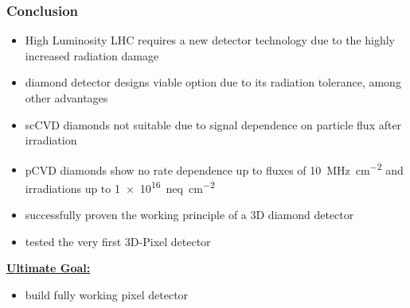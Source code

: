 \begin{frame}
	\frametitle{Conclusion}
	\begin{itemize}
		\setlength{\itemsep}{\fill}
		\item High Luminosity LHC requires a new detector technology due to the highly increased radiation damage 
		\item diamond detector designs viable option due to its radiation tolerance, among other advantages
		\item scCVD diamonds not suitable due to signal dependence on particle flux after irradiation
		\item pCVD diamonds show no rate dependence up to fluxes of \SI{10}{\mega\hertz\per cm^2} and irradiations up to \SI{1e16}{neq\per cm^2}
		\item successfully proven the working principle of a 3D diamond detector
		\item tested the very first 3D-Pixel detector
	\end{itemize}
	\vspace*{5pt}
	\textbf{\underline{Ultimate Goal:}}
	\begin{itemize}
		\item build fully working pixel detector
	\end{itemize}
\end{frame}